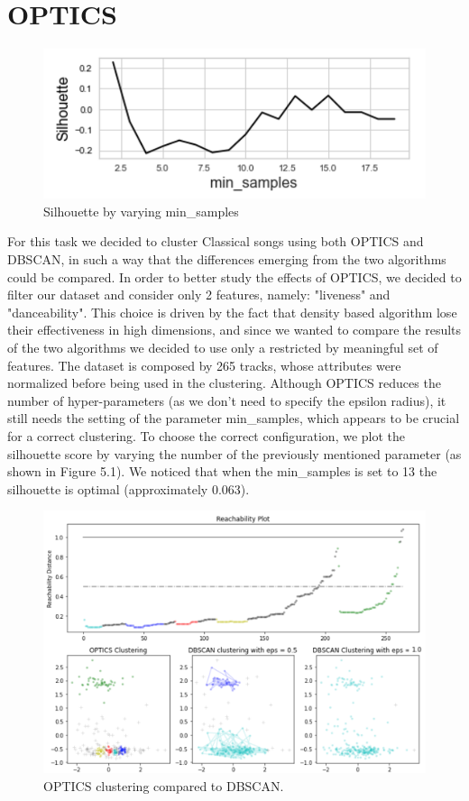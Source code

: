 \section{OPTICS}

\begin{figure}
  \centering
    \includegraphics[width=.3\textwidth]{images/OPTICS sil.png}
  \caption{Silhouette by varying min\_samples}
\end{figure}
For this task we decided to cluster Classical songs using both OPTICS and DBSCAN, in such a way that the differences emerging from the two algorithms could be compared. In order to better study the effects of OPTICS, we decided to filter our dataset and consider only 2 features, namely: "liveness" and "danceability". This choice is driven by the fact that density based algorithm lose their effectiveness in high dimensions, and since we wanted to compare the results of the two algorithms we decided to use only a restricted by meaningful set of features. The dataset is composed by 265 tracks, whose attributes were normalized before being used in the clustering. Although OPTICS reduces the number of hyper-parameters (as we don't need to specify the epsilon radius), it still needs the setting of the parameter min\_samples, which appears to be crucial for a correct clustering. To choose the correct configuration, we plot the silhouette score by varying the number of the previously mentioned parameter (as shown in Figure 5.1). We noticed that when the min\_samples is set to 13 the silhouette is optimal (approximately 0.063). 


\begin{figure}[!htb]
  \centering
  \includegraphics[width=0.8\linewidth]{images/OPTICS-Classical.png}
  \caption{OPTICS clustering compared to DBSCAN.}
\end{figure}

